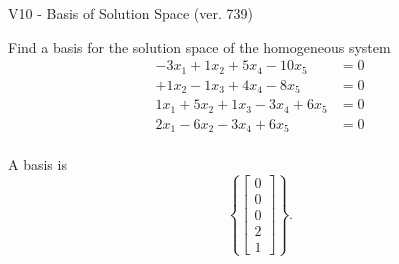 \begin{exercise}
  \begin{exerciseTitle}V10 - Basis of Solution Space (ver. 739)\end{exerciseTitle}
  \begin{exerciseStatement}
    Find a basis for the solution space of the homogeneous system 
\begin{align*}
 -3 x_ 1 + 1 x_ 2 + 5 x_ 4 -10 x_ 5 &= 0  \\ 
  + 1 x_ 2 -1 x_ 3 + 4 x_ 4 -8 x_ 5 &= 0  \\ 
  1 x_ 1 + 5 x_ 2 + 1 x_ 3 -3 x_ 4 + 6 x_ 5 &= 0  \\ 
  2 x_ 1 -6 x_ 2 -3 x_ 4 + 6 x_ 5 &= 0  \\ 
 \end{align*}


 
  \end{exerciseStatement}

  \begin{exerciseAnswer}
   A basis is   
\[\left\{\left[\begin{array}{c}
0 \\
0 \\
0 \\
2 \\
1
\end{array}\right]\right\}.\]

  


  \end{exerciseAnswer}
\end{exercise}